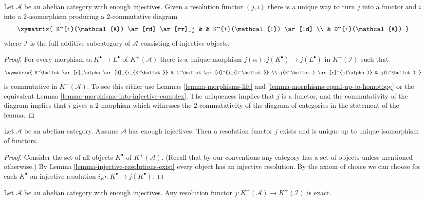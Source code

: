 \begin{lemma}
\label{lemma-resolution-functor}
Let $\mathcal{A}$ be an abelian category with enough injectives.
Given a resolution functor $(j, i)$ there is a unique way to
turn $j$ into a functor and $i$ into a $2$-isomorphism
producing a $2$-commutative diagram
$$
\xymatrix{
K^{+}(\mathcal{A}) \ar[rd] \ar[rr]_j & & K^{+}(\mathcal{I}) \ar[ld] \\
& D^{+}(\mathcal{A})
}
$$
where $\mathcal{I}$ is the full additive subcategory of $\mathcal{A}$
consisting of injective objects.
\end{lemma}

\begin{proof}
For every morphism $\alpha : K^\bullet \to L^\bullet$ of $K^{+}(\mathcal{A})$
there is a unique morphism
$j(\alpha) : j(K^\bullet) \to j(L^\bullet)$ in $K^{+}(\mathcal{I})$
such that
$$
\xymatrix{
K^\bullet \ar[r]_\alpha \ar[d]_{i_{K^\bullet}} &
L^\bullet \ar[d]^{i_{L^\bullet}} \\
j(K^\bullet) \ar[r]^{j(\alpha)} & j(L^\bullet)
}
$$
is commutative in $K^{+}(\mathcal{A})$. To see this either use
Lemmas \ref{lemma-morphisms-lift} and
\ref{lemma-morphisms-equal-up-to-homotopy}
or the equivalent
Lemma \ref{lemma-morphisms-into-injective-complex}.
The uniqueness implies that $j$ is a functor, and the commutativity of
the diagram implies that $i$ gives a $2$-morphism which witnesses the
$2$-commutativity of the diagram of categories in the statement of
the lemma.
\end{proof}

\begin{lemma}
\label{lemma-into-derived-category}
Let $\mathcal{A}$ be an abelian category.
Assume $\mathcal{A}$ has enough injectives.
Then a resolution functor $j$ exists and is
unique up to unique isomorphism of functors.
\end{lemma}

\begin{proof}
Consider the set of all objects $K^\bullet$ of $K^{+}(\mathcal{A})$.
(Recall that by our conventions any category has a set of
objects unless mentioned otherwise.)
By Lemma \ref{lemma-injective-resolutions-exist} every object
has an injective resolution.
By the axiom of choice we can choose for each $K^\bullet$
an injective resolution $i_{K^\bullet} : K^\bullet \to j(K^\bullet)$.
\end{proof}

\begin{lemma}
\label{lemma-j-is-exact}
Let $\mathcal{A}$ be an abelian category with enough injectives.
Any resolution functor
$j : K^{+}(\mathcal{A}) \to K^{+}(\mathcal{I})$
is exact.
\end{lemma}

